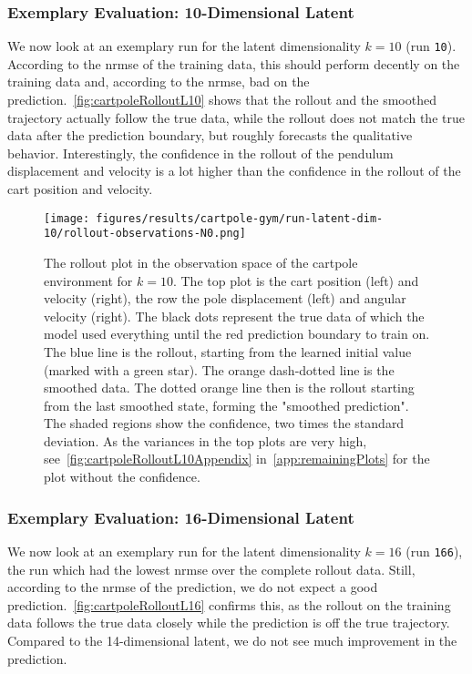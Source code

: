 		\subsubsection{Exemplary Evaluation: 10-Dimensional Latent}
			\label{subsubsec:cartpoleL10}

			We now look at an exemplary run for the latent dimensionality \( k = 10 \) (run \texttt{10}). According to the \ac{nrmse} of the training data, this should perform decently on the training data and, according to the \ac{nrmse}, bad on the prediction.~\autoref{fig:cartpoleRolloutL10} shows that the rollout and the smoothed trajectory actually follow the true data, while the rollout does not match the true data after the prediction boundary, but roughly forecasts the qualitative behavior. Interestingly, the confidence in the rollout of the pendulum displacement and velocity is a lot higher than the confidence in the rollout of the cart position and velocity.

			\begin{figure}
				\centering
				\texttt{[image: figures/results/cartpole-gym/run-latent-dim-10/rollout-observations-N0.png]}
				\caption[Rollout of the cartpole experiment for 10 latent dimensions]{The rollout plot in the observation space of the cartpole environment for \(k = 10\). The top plot is the cart position (left) and velocity (right), the row the pole displacement (left) and angular velocity (right). The black dots represent the true data of which the model used everything until the red prediction boundary to train on. The blue line is the rollout, starting from the learned initial value (marked with a green star). The orange dash-dotted line is the smoothed data. The dotted orange line then is the rollout starting from the last smoothed state, forming the "smoothed prediction". The shaded regions show the confidence, \ie two times the standard deviation. As the variances in the top plots are very high, see~\autoref{fig:cartpoleRolloutL10Appendix} in~\autoref{app:remainingPlots} for the plot without the confidence.}
				\label{fig:cartpoleRolloutL10}
			\end{figure}

		\subsubsection{Exemplary Evaluation: 16-Dimensional Latent}
			\label{subsubsec:cartpoleL16}

			We now look at an exemplary run for the latent dimensionality \( k = 16 \) (run \texttt{166}), the run which had the lowest \ac{nrmse} over the complete rollout data. Still, according to the \ac{nrmse} of the prediction, we do not expect a good prediction.~\autoref{fig:cartpoleRolloutL16} confirms this, as the rollout on the training data follows the true data closely while the prediction is off the true trajectory. Compared to the 14-dimensional latent, we do not see much improvement in the prediction.

